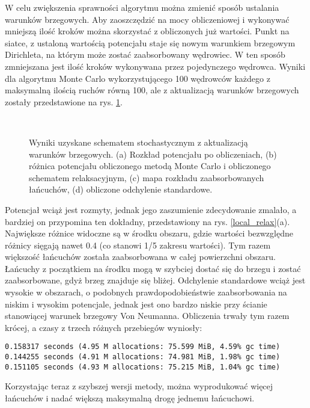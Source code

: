 \documentclass[a4paper, 12pt]{article}
\begin{document}
	W celu zwiększenia sprawności algorytmu można zmienić sposób ustalania warunków brzegowych. 
	Aby zaoszczędzić na mocy obliczeniowej i wykonywać mniejszą ilość kroków można skorzystać z obliczonych już wartości.
	Punkt na siatce, z ustaloną wartością potencjału staje się nowym warunkiem brzegowym Dirichleta, na którym może zostać zaabsorbowany wędrowiec. 
	W ten sposób zmniejszana jest ilość kroków wykonywana przez pojedynczego wędrowca.
	Wyniki dla algorytmu Monte Carlo wykorzystującego 100 wędrowców każdego z maksymalną ilością ruchów równą 100, ale z aktualizacją warunków brzegowych zostały przedstawione na rys. \ref{task_2}.
	\begin{figure}[h]
		\centering
		\begin{subfigure}{0.49\textwidth}
			\centering
			
			\caption{}		
		\end{subfigure}
		\begin{subfigure}{0.49\textwidth}
			\centering
			
			\caption{}		
		\end{subfigure}
		\\
		\begin{subfigure}{0.49\textwidth}
			\centering
			
			\caption{}		
		\end{subfigure}
		\begin{subfigure}{0.49\textwidth}
			\centering
			
			\caption{}		
		\end{subfigure}
		\caption{Wyniki uzyskane schematem stochastycznym z aktualizacją warunków brzegowych. (a) Rozkład potencjału po obliczeniach, (b) różnica potencjału obliczonego metodą Monte Carlo i obliczonego schematem relaksacyjnym, (c) mapa rozkładu zaabsorbowanych łańcuchów, (d) obliczone odchylenie standardowe.}
		\label{task_2}
	\end{figure}
	Potencjał wciąż jest rozmyty, jednak jego zaszumienie zdecydowanie zmalało, a bardziej on przypomina ten dokładny, przedstawiony na rys. \ref{local_relax}(a).
	Największe różnice widoczne są w środku obszaru, gdzie wartości bezwzględne różnicy sięgają nawet 0.4 (co stanowi 1/5 zakresu wartości).
	Tym razem większość łańcuchów została zaabsorbowana w całej powierzchni obszaru.
	Łańcuchy z początkiem na środku mogą w szybciej dostać się do brzegu i zostać zaabsorbowane, gdyż brzeg znajduje się bliżej.
	Odchylenie standardowe wciąż jest wysokie w obszarach, o podobnych prawdopodobieństwie zaabsorbowania na niskim i wysokim potencjale, jednak jest ono bardzo niskie przy ścianie stanowiącej warunek brzegowy Von Neumanna.
	Obliczenia trwały tym razem krócej, a  czasy z trzech różnych przebiegów wyniosły:
	\begin{verbatim}
0.158317 seconds (4.95 M allocations: 75.599 MiB, 4.59% gc time)
0.144255 seconds (4.91 M allocations: 74.981 MiB, 1.98% gc time)
0.151105 seconds (4.93 M allocations: 75.215 MiB, 1.04% gc time)
	\end{verbatim}
	Korzystając teraz z szybszej wersji metody, można wyprodukować więcej łańcuchów i nadać większą maksymalną drogę jednemu łańcuchowi.
	
\end{document}
